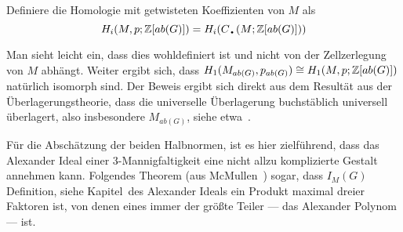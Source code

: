 	\begin{defn}
		Definiere die Homologie mit getwisteten Koeffizienten von $M$ als
		\[
		 H_i(M,p;\ZZ[ab(G)])=H_i(C_\text{\textbullet}(M;\ZZ[ab(G)])) 	
		 \] 
	\end{defn}

	Man sieht leicht ein, dass dies wohldefiniert ist und nicht von der Zellzerlegung von $M$ abhängt. Weiter ergibt sich, dass $H_1( M_{ab(G)} ,  p_{ab(G)}) \cong H_1(M,p;\mathbb{Z}[ab(G)])$ natürlich isomorph sind. Der Beweis ergibt sich direkt aus dem Resultät aus der Überlagerungstheorie, dass die universelle Überlagerung buchstäblich universell überlagert, also insbesondere $M_{ab(G)}$, siehe etwa~\cite[Kapitel~1.3]{Hatcher.2002}.
    
    Für die Abschätzung der beiden Halbnormen, ist es hier zielführend, dass das Alexander Ideal einer 3-Mannigfaltigkeit eine nicht allzu komplizierte Gestalt annehmen kann. Folgendes Theorem (aus McMullen~\cite{MCMULLEN.2002}) sogar, dass $I_M(G)$ Definition, siehe Kapitel~des Alexander Ideals ein Produkt maximal dreier Faktoren ist, von denen eines immer der größte Teiler --- das Alexander Polynom --- ist. 


